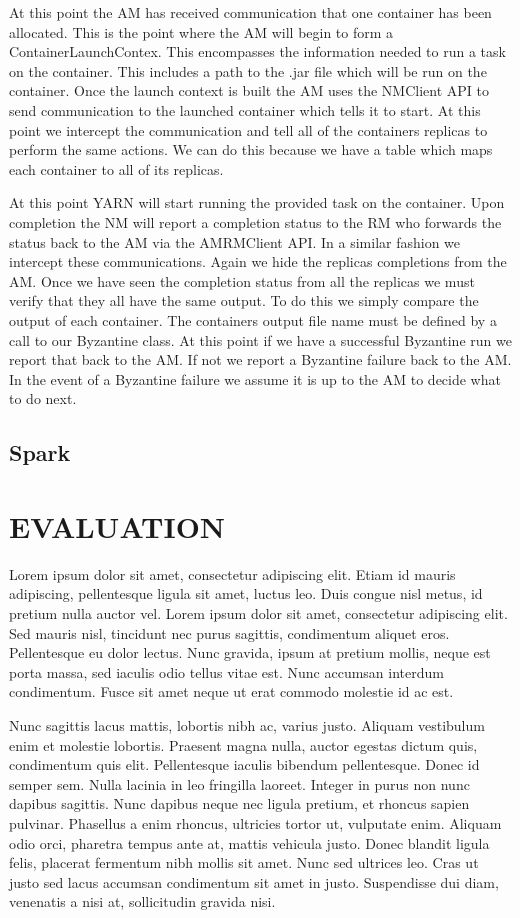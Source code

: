 \documentclass{sig-alternate}
\begin{document}
At this point the AM has received communication that one container has been allocated. This is the point where the AM will begin to form a ContainerLaunchContex. This encompasses the
information needed to run a task on the container. This includes a path to the .jar file which will be run on the container. Once the launch context is built the AM uses the NMClient
API to send communication to the launched container which tells it to start. At this point we intercept the communication and tell all of the containers replicas to perform the same
actions. We can do this because we have a table which maps each container to all of its replicas. 

At this point YARN will start running the provided task on the container. Upon completion the NM will report a completion status to the RM who forwards the status back to the AM via 
the AMRMClient API. In a similar fashion we intercept these communications. Again we hide the replicas completions from the AM. Once we have seen the completion status from all the 
replicas we must verify that they all have the same output. To do this we simply compare the output of each container. The containers output file name must be defined by a call 
to our Byzantine class. At this point if we have a successful Byzantine run we report that back to the AM. If not we report a Byzantine failure back to the AM. In the event of 
a Byzantine failure we assume it is up to the AM to decide what to do next. 



\subsection{Spark}
 

\section {EVALUATION}
\label{sec:evaluation}
Lorem ipsum dolor sit amet, consectetur adipiscing elit. Etiam id mauris adipiscing, pellentesque ligula sit amet, luctus leo. 
Duis congue nisl metus, id pretium nulla auctor vel. Lorem ipsum dolor sit amet, consectetur adipiscing elit. Sed mauris nisl, 
tincidunt nec purus sagittis, condimentum aliquet eros. Pellentesque eu dolor lectus. Nunc gravida, ipsum at pretium mollis, neque 
est porta massa, sed iaculis odio tellus vitae est. Nunc accumsan interdum condimentum. Fusce sit amet neque ut erat commodo molestie id ac est.

Nunc sagittis lacus mattis, lobortis nibh ac, varius justo. Aliquam vestibulum enim et molestie lobortis. Praesent magna nulla, auctor
egestas dictum quis, condimentum quis elit. Pellentesque iaculis bibendum pellentesque. Donec id semper sem. Nulla lacinia in leo fringilla 
laoreet. Integer in purus non nunc dapibus sagittis. Nunc dapibus neque nec ligula pretium, et rhoncus sapien pulvinar. Phasellus a enim rhoncus,
 ultricies tortor ut, vulputate enim. Aliquam odio orci, pharetra tempus ante at, mattis vehicula justo. Donec blandit ligula felis, placerat 
 fermentum nibh mollis sit amet. Nunc sed ultrices leo. Cras ut justo sed lacus accumsan condimentum sit amet in justo. Suspendisse dui diam, 
 venenatis a nisi at, sollicitudin gravida nisi.
 
\end{document}
